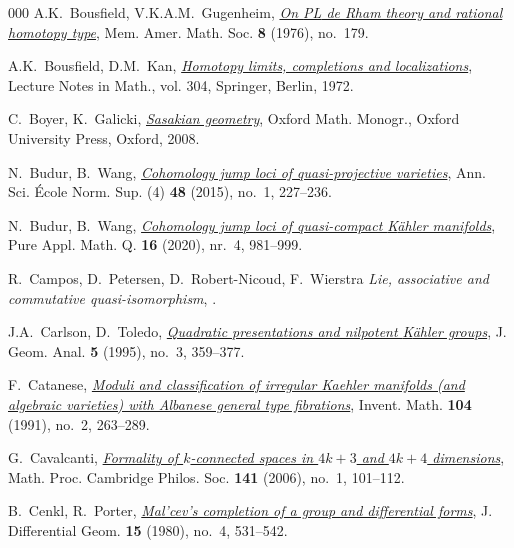 \documentclass{article}
\numberwithin{equation}{section}
\theoremstyle{definition}
\begin{document}
\begin{thebibliography}{000}
 A.K.~Bousfield, V.K.A.M.~Gugenheim, 
\href{https://dx.doi.org/10.1090/memo/0179}%
{\em On \textup{PL} de Rham theory and rational homotopy type}, 
Mem. Amer. Math. Soc. \textbf{8} (1976), no.~179.

 A.K.~Bousfield, D.M.~Kan, 
\href{https://dx.doi.org/10.1007/978-3-540-38117-4}%
{\em Homotopy limits, completions and localizations}, Lecture Notes in Math.,
vol. 304, Springer, Berlin, 1972.

  C.~Boyer,  K.~Galicki, 
\href{http://ukcatalogue.oup.com/product/9780198564959.do}
{\em Sasakian geometry}, Oxford Math. Monogr., 
Oxford University Press, Oxford, 2008.

 N.~Budur, B.~Wang, 
\href{https://dx.doi.org/10.24033/asens.2242}%
{\em Cohomology jump loci of quasi-projective varieties}, 
Ann. Sci. \'{E}cole Norm. Sup. (4) \textbf{48} (2015), no.~1, 227--236. 

  N.~Budur, B.~Wang, 
\href{https://dx.doi.org/10.4310/PAMQ.2020.v16.n4.a3}%
{\em Cohomology jump loci of quasi-compact {K}\"{a}hler manifolds},  
Pure Appl. Math. Q. \textbf{16} (2020), nr.~4, 981--999.

 R.~Campos, D.~Petersen, D.~Robert-Nicoud, F.~Wierstra
{\em Lie, associative and commutative quasi-isomorphism}, 
.

 J.A.~Carlson, D.~Toledo,
\href{http://dx.doi.org/10.1007/BF02921801}%
{\em Quadratic presentations and nilpotent {K}\"ahler groups}, 
J. Geom. Anal. \textbf{5} (1995), no.~3, 359--377. 

 F.~Catanese, 
\href{https://doi.org/10.1007/BF01245076}%
{\em Moduli and classification of irregular Kaehler manifolds 
(and algebraic varieties) with Albanese general type fibrations}, 
Invent. Math. \textbf{104} (1991), no.~2, 263--289. 

 G.~Cavalcanti,
\href{https://dx.doi.org/10.1017/S0305004106009340}%
{\em Formality of $k$-connected spaces in $4k+3$ 
and $4k+4$ dimensions}, Math. Proc. Cambridge 
Philos. Soc. \textbf{141} (2006), no.~1, 101--112.

 B.~Cenkl, R.~Porter,
\href{https://dx.doi.org/10.4310/jdg/1214435841}%
{\em Mal'cev's completion of a group and differential forms}, 
J. Differential Geom. \textbf{15} (1980), no.~4, 531--542. 


\end{thebibliography}
\end{document}

